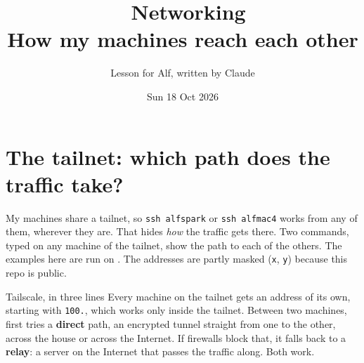 \documentclass[11pt,a4paper]{article}
\title{\emo{globe with meridians}\ Networking\\[0.3em]
  \large How my machines reach each other}
\author{Lesson for Alf, written by Claude}
\date{Sun 18 Oct 2026}
\begin{document}
\maketitle

\section{The tailnet: which path does the traffic take?}

My machines share a tailnet, so \texttt{ssh alfspark} or \texttt{ssh alfmac4} works from any of them, wherever they are. That hides \emph{how} the traffic gets there. Two commands, typed on any machine of the tailnet, show the path to each of the others. The examples here are run on . The addresses are partly masked (\texttt{x}, \texttt{y}) because this repo is public.

\begin{insight}{Tailscale, in three lines}
Every machine on the tailnet gets an address of its own, starting with \texttt{100.}, which works only inside the tailnet. Between two machines,  first tries a \textbf{direct} path, an encrypted tunnel straight from one to the other, across the house or across the Internet. If firewalls block that, it falls back to a \textbf{relay}: a  server on the Internet that passes the traffic along. Both work.
\end{insight}

\begin{center}
\end{center}
\end{document}
